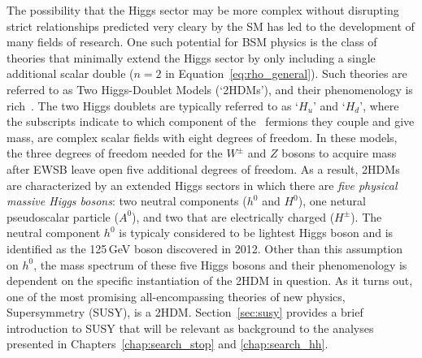 The possibility that the Higgs sector may be more complex without disrupting strict relationships
predicted very cleary by the SM has led to the development of many fields of research.
One such potential for BSM physics is the class of theories that minimally extend the
Higgs sector by only including a single additional scalar double ($n = 2$ in Equation~\ref{eq:rho_general}).
Such theories are referred to as Two Higgs-Doublet Models (`2HDMs'), and their
phenomenology is rich~\cite{2HDMPheno}.
The two Higgs doublets are typically referred to as `$H_u$' and `$H_d$', where the subscripts
indicate to which component of the \SUtwo~fermions they couple and give mass, are complex scalar
fields with eight degrees of freedom.
In these models, the three degrees of freedom needed for the $W^{\pm}$ and $Z$ bosons
to acquire mass after EWSB leave open five additional degrees of freedom.
As a result, 2HDMs are characterized by an extended Higgs sectors in which there are \textit{five
physical massive Higgs bosons}: two neutral components ($h^0$ and $H^0$), one netural pseudoscalar particle ($A^0$),
and two that are electrically charged ($H^{\pm}$).
The neutral component $h^0$ is typicaly considered to be lightest Higgs boson and is identified as the
125\,GeV boson discovered in 2012.
Other than this assumption on $h^0$, the mass spectrum of these five Higgs bosons and their 
phenomenology is dependent on the specific instantiation of the 2HDM in question.
As it turns out, one of the most promising all-encompassing theories of new physics,
Supersymmetry (SUSY), is a 2HDM.
Section~\ref{sec:susy} provides a brief introduction to SUSY that will be relevant
as background to the analyses presented in Chapters~\ref{chap:search_stop} and \ref{chap:search_hh}.

%
%

